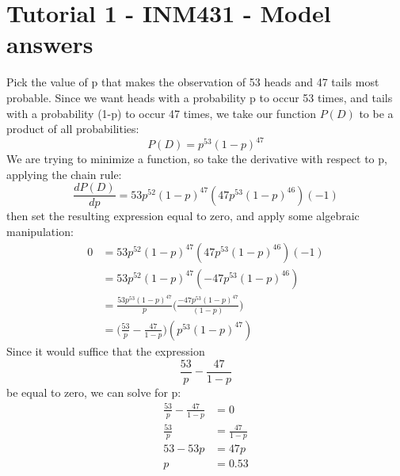 \documentclass{article}
\begin{document}
\section*{Tutorial 1 - INM431 - Model answers}
Pick the value of p that makes the observation of 53 heads and 47 tails most probable.   
Since we want heads with a probability p to occur 53 times, and tails with a probability (1-p) to occur 47 times, we take our function $P(D)$  to be a product of all probabilities:
\begin{equation}
    P(D) = p^{53}(1-p)^{47}
\end{equation}
We are trying to minimize a function, so take the derivative with respect to p, applying the chain rule:
$$
\frac{dP(D)}{dp}=53p^{52}(1-p)^{47}(47p^{53}(1-p)^{46})(-1)
$$
then set the resulting expression equal to zero, and apply some algebraic manipulation:
\begin{align*}
0 & = 53p^{52}(1-p)^{47}(47p^{53}(1-p)^{46})(-1)  \\
& = 53p^{52}(1-p)^{47}(-47p^{53}(1-p)^{46}) \\
& = \frac{53p^{53}(1-p)^{47}}{p}\Bigg(\frac{-47p^{53}(1-p)^{47}}{(1-p)}\Bigg) \\
& = \Bigg(\frac{53}{p}-\frac{47}{1-p}\Bigg)(p^{53}(1-p)^{47})
\end{align*}
Since it would suffice that the expression
$$
\frac{53}{p}-\frac{47}{1-p}
$$
be equal to zero, we can solve for p:
\begin{align*}
\frac{53}{p}-\frac{47}{1-p} & = 0 \\
\frac{53}{p} & = \frac{47}{1-p} \\
53 - 53p & = 47p \\
p & = 0.53 \\
\end{align*}
\end{document}
